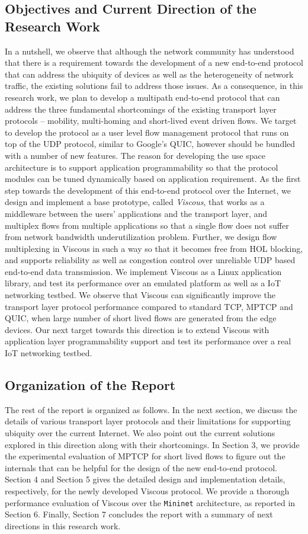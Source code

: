 \subsection{Objectives and Current Direction of the Research Work}
In a nutshell, we observe that although the network community has understood that there is a requirement towards the development of a new end-to-end protocol that can address the ubiquity of devices as well as the heterogeneity of network traffic, the existing solutions fail to address those issues. As a consequence, in this research work, we plan to develop a multipath end-to-end protocol that can address the three fundamental shortcomings of the existing transport layer protocols -- mobility, multi-homing and short-lived event driven flows. We target to develop the protocol as a user level flow management protocol that runs on top of the UDP protocol, similar to Google's QUIC, however should be bundled with a number of new features. The reason for developing the use space architecture is to support application programmability so that the protocol modules can be tuned dynamically based on application requirement. As the first step towards the development of this end-to-end protocol over the Internet, we design and implement a base prototype, called \textit{Viscous}, that works as a middleware between the users' applications and the transport layer, and multiplex flows from multiple applications so that a single flow does not suffer from network bandwidth underutilization problem. Further, we design flow multiplexing in Viscous in such a way so that it becomes free from HOL blocking, and supports reliability as well as congestion control over unreliable UDP based end-to-end data transmission. We implement Viscous as a Linux application library, and test its performance over an emulated platform as well as a IoT networking testbed. We observe that Viscous can significantly improve the transport layer protocol performance compared to standard TCP, MPTCP and QUIC, when large number of short lived flows are generated from the edge devices. Our next target towards this direction is to extend Viscous with application layer programmability support and test its performance over a real IoT networking testbed. 

\subsection{Organization of the Report}
The rest of the report is organized as follows. In the next section, we discuss the details of various transport layer protocols and their limitations for supporting ubiquity over the current Internet. We also point out the current solutions explored in this direction along with their shortcomings. In Section 3, we provide the experimental evaluation of MPTCP for short lived flows to figure out the internals that can be helpful for the design of the new end-to-end protocol. Section 4 and Section 5 gives the detailed design and implementation details, respectively, for the newly developed Viscous protocol. We provide a thorough performance evaluation of Viscous over the \texttt{Mininet} architecture, as reported in Section 6. Finally, Section 7 concludes the report with a summary of next directions in this research work. 

\newpage 